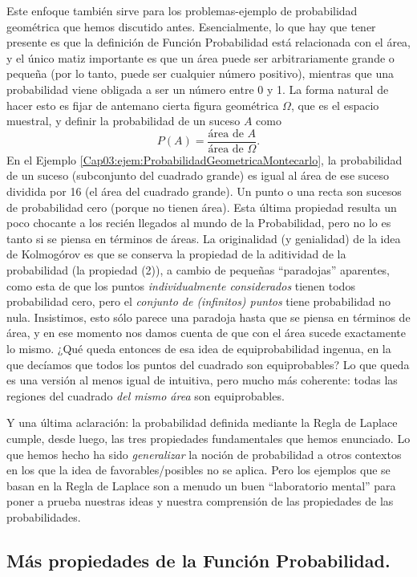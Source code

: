 Este enfoque también sirve para los problemas-ejemplo de probabilidad geométrica que hemos discutido antes. Esencialmente, lo que hay que tener presente es que la definición de Función Probabilidad está relacionada con el área, y el único matiz importante es que un área puede ser arbitrariamente grande o pequeña (por lo tanto, puede ser cualquier número positivo), mientras que una probabilidad viene obligada a ser un número entre 0 y 1. La forma natural de hacer esto es fijar de antemano cierta figura geométrica $\Omega$, que es el espacio muestral, y definir la probabilidad de un  suceso $A$ como
\[P(A)=\dfrac{\mbox{área de }A}{\mbox{área de }\Omega}.\]
En el Ejemplo \ref{Cap03:ejem:ProbabilidadGeometricaMontecarlo}, la probabilidad de un suceso (subconjunto del cuadrado grande) es igual al área de ese suceso dividida por 16 (el área del cuadrado grande). {\sf Un punto o una recta son sucesos de probabilidad cero} (porque no tienen área). Esta última propiedad resulta un poco chocante a los recién llegados al mundo de la Probabilidad, pero no lo es tanto si se piensa en términos de áreas. {La originalidad (y genialidad) de la idea de Kolmogórov es que se conserva la propiedad de la aditividad de la probabilidad (la propiedad (2)), a cambio de pequeñas ``paradojas'' aparentes, como esta de que los puntos {\em individualmente considerados} tienen todos probabilidad cero, pero el {\em conjunto de (infinitos) puntos} tiene probabilidad no nula. Insistimos, esto sólo parece una paradoja hasta que se piensa en términos de área, y en ese momento nos damos cuenta de que con el área sucede exactamente lo mismo. ¿Qué queda entonces de esa idea de equiprobabilidad ingenua, en la que decíamos que todos los puntos del cuadrado son equiprobables? Lo que queda es una versión al menos igual de intuitiva, pero mucho más coherente: todas las regiones del cuadrado {\em del mismo área} son equiprobables.}

Y una última aclaración: la probabilidad definida mediante la Regla de Laplace cumple, desde luego, las tres propiedades fundamentales que hemos enunciado. Lo que hemos hecho ha sido {\em generalizar} la noción de probabilidad a otros contextos en los que la idea de favorables/posibles no se aplica. Pero los ejemplos que se basan en la Regla de Laplace son a menudo un buen ``laboratorio mental'' para poner a prueba nuestras ideas y nuestra comprensión de las propiedades de las probabilidades.

\subsection{Más propiedades de la Función Probabilidad.}
\label{cap03:subsec:MasPropiedadesFuncionProbabilidad}

